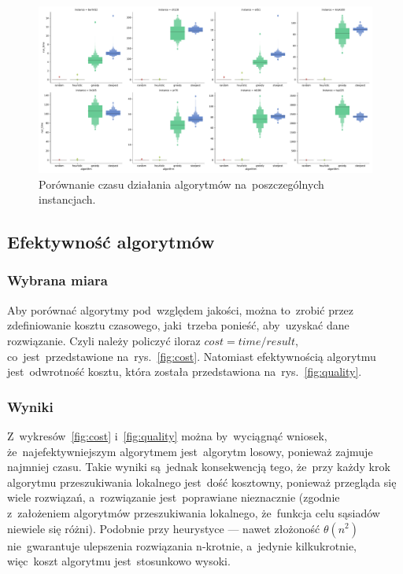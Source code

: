 \begin{figure}
\begin{center}
\includegraphics[width=1.0\textwidth]{graphs/time_comparison_letval.pdf}
\end{center}
\caption{Porównanie czasu działania algorytmów na~poszczególnych instancjach.}
\label{fig:time}
\end{figure}

\subsection{Efektywność algorytmów}

\subsubsection{Wybrana miara}

Aby porównać algorytmy pod~względem jakości, można to~zrobić przez zdefiniowanie kosztu czasowego, jaki~trzeba ponieść, aby~uzyskać dane rozwiązanie. Czyli należy policzyć iloraz $cost = time / result$, co~jest~przedstawione na~rys.~\ref{fig:cost}. Natomiast efektywnością algorytmu jest~odwrotność kosztu, która została przedstawiona na~rys.~\ref{fig:quality}.

\subsubsection{Wyniki}

Z~wykresów~\ref{fig:cost} i~\ref{fig:quality} można by~wyciągnąć wniosek, że~najefektywniejszym algorytmem jest~algorytm losowy, ponieważ zajmuje najmniej czasu. Takie wyniki są~jednak konsekwencją tego, że~przy każdy krok algorytmu przeszukiwania lokalnego jest~dość kosztowny, ponieważ przegląda się wiele rozwiązań, a~rozwiązanie jest~poprawiane nieznacznie (zgodnie z~założeniem algorytmów przeszukiwania lokalnego, że~funkcja celu sąsiadów niewiele się różni). Podobnie przy heurystyce --- nawet złożoność $\theta(n^2)$ nie~gwarantuje ulepszenia rozwiązania n-krotnie, a~jedynie kilkukrotnie, więc~koszt algorytmu jest~stosunkowo wysoki.

